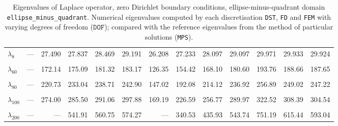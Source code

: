 \begin{table}[htbp]
{{\begin{tabular}{lrrrrrrrrrrrr}
    $\lambda_{8}$ & --- & 27.490 & 27.837 & 28.469 & 29.191 & 26.208 & 27.233 & 28.097 & 29.097 & 29.971 & 29.933 & 29.924 \\
    & & & & & & & & & & & & \\
    $\lambda_{60}$ & --- & 172.14 & 175.09 & 181.32 & 183.17 & 126.35 & 154.42 & 168.10 & 180.60 & 193.76 & 188.66 & 187.65 \\
    & & & & & & & & & & & & \\
    $\lambda_{80}$ & --- & 220.73 & 233.04 & 238.71 & 242.90 & 147.02 & 192.08 & 214.12 & 236.92 & 256.89 & 249.02 & 247.22 \\
    & & & & & & & & & & & & \\
    $\lambda_{100}$ & --- & 274.00 & 285.50 & 291.06 & 297.88 & 169.19 & 226.59 & 256.77 & 289.97 & 322.52 & 308.39 & 304.54 \\
    & & & & & & & & & & & & \\
    $\lambda_{200}$ & --- & --- & 541.91 & 560.75 & 574.27 & --- & 340.53 & 435.93 & 543.74 & 751.19 & 615.44 & 593.04 \\
    \bottomrule
  \end{tabular}}}
  \caption{Eigenvalues of Laplace operator, zero Dirichlet boundary conditions, ellipse-minus-quadrant domain \texttt{ellipse\_minus\_quadrant}. Numerical eigenvalues computed by each discretisation \texttt{DST}, \texttt{FD} and \texttt{FEM} with varying degrees of freedom ($\mathtt{DOF}$); compared with the reference eigenvalues from the method of particular solutions (\texttt{MPS}).}
  \label{tab:eigenvalues_head_ellipse_minus_quadrant_transposed_extended}
\end{table}
